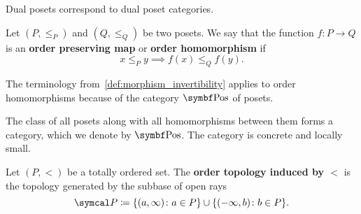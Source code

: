 \begin{proposition}\label{thm:dual_poset_dual_poset_category}
  Dual posets correspond to dual poset categories.
\end{proposition}

\begin{definition}\label{def:order_homomorphism}
  Let \( (P, \leq_P) \) and \( (Q, \leq_Q) \) be two posets. We say that the function \( f: P \to Q \) is an \textbf{order preserving map} or \textbf{order homomorphism} if
  \begin{equation*}
    x \leq_P y \implies f(x) \leq_Q f(y).
  \end{equation*}

  The terminology from~\cref{def:morphism_invertibility} applies to order homomorphisms because of the category \( \Bold{Pos} \) of posets.
\end{definition}

\begin{definition}\label{def:category_of_posets}
  The class of all posets along with all homomorphisms between them forms a category, which we denote by \( \Bold{Pos} \). The category is concrete and locally small.
\end{definition}

\begin{definition}\label{def:order_topology}\cite{nLab:order_topology}
  Let \( (P, <) \) be a totally ordered set. The \textbf{order topology induced by \( < \)} is the topology generated by the subbase of open rays
  \begin{equation*}
    \Cal{P} \coloneqq \{ (a, \infty) \colon a \in P \} \cup \{ (-\infty, b) \colon b \in P \}.
  \end{equation*}
\end{definition}
